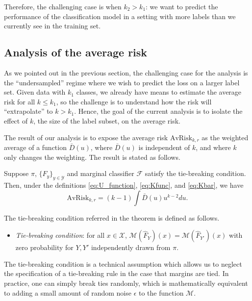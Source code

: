 \documentclass[12pt]{article}
\begin{document}
Therefore, the challenging case is when $k_2 > k_1$: we want to
predict the performance of the classification model in a setting with
more labels than we currently see in the training set.

\subsection{Analysis of the average risk}

As we pointed out in the previous section, the challenging case for
the analysis is the ``undersampled'' regime where we wish to predict
the loss on a larger label set.  Given data with $k_1$ classes, we
already have means to estimate the average risk for all $k \leq k_1$,
so the challenge is to understand how the risk will ``extrapolate'' to
$k > k_1$.  Hence, the goal of the current analysis is to isolate the
effect of $k$, the size of the label subset, on the average risk.

The result of our analysis is to expose the average risk
$\text{AvRisk}_{k, r}$ as the weighted average of a function
$\bar{D}(u)$, where $\bar{D}(u)$ is independent of $k$, and where $k$
only changes the weighting.  The result is stated as follows.

\begin{theorem}\label{theorem:avrisk_identity}
Suppose $\pi$, $\{F_y\}_{y \in \mathcal{Y}}$ and marginal classifier
$\mathcal{F}$ satisfy the tie-breaking condition.  Then, under the
definitions \eqref{eq:U_function}, \eqref{eq:Kfunc},
and \eqref{eq:Kbar}, we have
\begin{equation}\label{eq:avrisk_identity}
\text{AvRisk}_{k, r} = (k-1) \int \bar{D}(u) u^{k-2} du.
\end{equation}
\end{theorem}

The tie-breaking condition referred in the theorem is defined as follows.
\begin{itemize}
\item 
\emph{Tie-breaking condition}: for all $x \in \mathcal{X}$,
$\mathcal{M}(\hat{F}_Y)(x) = \mathcal{M}(\hat{F}_{Y'})(x)$
with zero probability for $Y, Y'$ independently drawn from $\pi$.
\end{itemize}
The tie-breaking condition is a technical assumption which allows us
to neglect the specification of a tie-breaking rule in the case that
margins are tied.  In practice, one can simply break ties randomly,
which is mathematically equivalent to adding a small amount of random
noise $\epsilon$ to the function $\mathcal{M}$.
\end{document}
